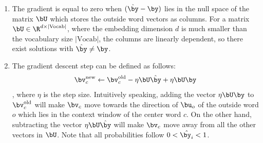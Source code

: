 \begin{parts}
{\begin{enumerate}[label=\roman*.]
\begin{align*}
            \end{align*}
            notice that $\by_o=1,\ \by_{w'}=0,\ w' \ne o$:
            \begin{align*}
                \frac{\partial \bJ_{\text{naive-softmax}}(\bv_c,o,\bU)}{\partial \bv_c} &=\left( \begin{bmatrix} \hat{\by}_1 \\ \vdots \\ \hat{\by}_o\\ \vdots \\ \hat{\by}_{\|\text{Vocab}\|}\end{bmatrix} - \begin{bmatrix} \by_1 \\ \vdots \\ \by_o\\ \vdots \\ \by_{\|\text{Vocab}\|}\end{bmatrix} \right)^\top \begin{bmatrix} \bu_1^\top \\ \vdots \\ \bu_o^\top\\ \vdots \\ \bu_{\|\text{Vocab}\|}^\top \end{bmatrix}\\
                &=(\hat{\by} - \by)^\top \bU^\top
            \end{align*}
            since the note mentioned above, the result should have the same shape as $\bv_c$,
            \begin{align*}
                \frac{\partial \bJ_{\text{naive-softmax}}(\bv_c,o,\bU)}{\partial \bv_c} &=\bU (\hat{\by} - \by)
            \end{align*}
        \item The gradient is equal to zero when $(\hat{\by}-\by)$ lies in the null space of the matrix $\bU$ which stores the outside word vectors as columns. For a matrix $\bU \in \R^{d \times |\text{Vocab}|}$, where the embedding dimension $d$ is much smaller than the vocabulary size $|\text{Vocab}|$, the columns are linearly dependent, so there exist solutions with $\hat{\by} \ne \by$.
        \item The gradient descent step can be defined as follows:
            \begin{equation*}
                \bv_c^{\text{new}} \gets \bv_c^{\text{old}} - \eta\bU\hat{\by} +\eta\bU\by 
            \end{equation*}
            , where $\eta$ is the step size. Intuitively speaking, adding the vector $\eta\bU\by$ to $\bv_c^{\text{old}}$ will make $\bv_c$ move towards the direction of $\bu_o$ of the outside word $o$ which lies in the context window of the center word $c$. On the other hand, subtracting the vector $\eta\bU\hat{\by}$ will make $\bv_c$ move away from all the other vectors in $\bU$. Note that all probabilities follow $0<\hat{\by_i}<1$.
    \end{enumerate}
}


\end{parts}
